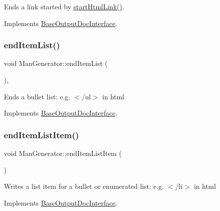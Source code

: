 Ends a link started by \mbox{\hyperlink{class_man_generator_a605e678d3be65519e6b94dff6e403e79}{start\+Html\+Link()}}. 

Implements \mbox{\hyperlink{class_base_output_doc_interface_afb808c1c487135d4fb2156d0675b387e}{Base\+Output\+Doc\+Interface}}.

\mbox{\label{class_man_generator_abb7aa578a49c62b103f85e0f5d3c9e2a}} 
\subsubsection{\texorpdfstring{endItemList()}{endItemList()}}
{\footnotesize\ttfamily void Man\+Generator\+::end\+Item\+List (\begin{DoxyParamCaption}{ }\end{DoxyParamCaption})\hspace{0.3cm}{\ttfamily [inline]}, {\ttfamily [virtual]}}

Ends a bullet list\+: e.\+g. {\ttfamily $<$/ul$>$} in html 

Implements \mbox{\hyperlink{class_base_output_doc_interface_a3493b65672bf134033bd3bb296acdff4}{Base\+Output\+Doc\+Interface}}.

\mbox{\label{class_man_generator_a87a722d58e6364660622ab086f20edc8}} 
\subsubsection{\texorpdfstring{endItemListItem()}{endItemListItem()}}
{\footnotesize\ttfamily void Man\+Generator\+::end\+Item\+List\+Item (\begin{DoxyParamCaption}{ }\end{DoxyParamCaption})\hspace{0.3cm}{\ttfamily [virtual]}}

Writes a list item for a bullet or enumerated list\+: e.\+g. {\ttfamily $<$/li$>$} in html 

Implements \mbox{\hyperlink{class_base_output_doc_interface_a90d290d7a06a9e7ecd968c8da90ed665}{Base\+Output\+Doc\+Interface}}.

\mbox{\label{class_man_generator_a7c4c2315a23018eb35413776b36b29e7}} 
